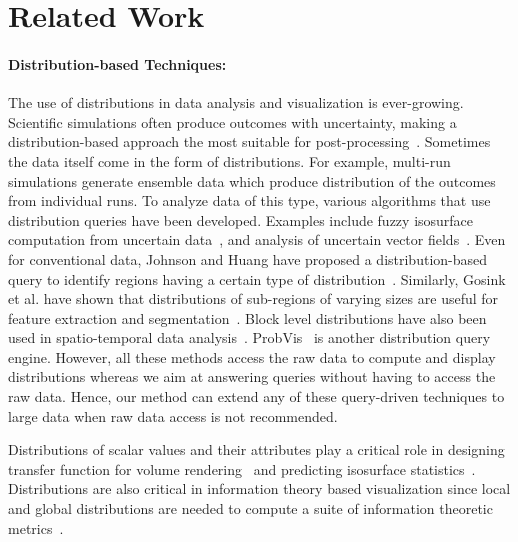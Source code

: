 \section{Related Work}
\label{sec:relwork}
\paragraph{Distribution-based Techniques:} The use of distributions in data analysis and visualization is ever-growing.  Scientific simulations often produce outcomes with uncertainty, making a distribution-based approach the most suitable for post-processing~\cite{Hixel11}. Sometimes the data itself come in the form of distributions. For example, multi-run simulations generate ensemble data which produce distribution of the outcomes from individual runs. To analyze data of this type, various algorithms that use distribution queries have been developed.  Examples include fuzzy isosurface computation from uncertain data~\cite{Hixel11}, and analysis of uncertain vector fields~\cite{uncertain3d11}. Even for conventional data, Johnson and Huang have proposed a distribution-based query to identify regions having a certain type of distribution~\cite{johnson09}. Similarly, Gosink et al. have shown that distributions of sub-regions of varying sizes are useful for feature extraction and segmentation~\cite{qdv11}. Block level distributions have also been used in spatio-temporal data analysis~\cite{transgraph11}. ProbVis~\cite{probvis12} is another distribution query engine. However, all these methods access the raw data to compute and display distributions whereas we aim at answering queries without having to access the raw data. Hence, our method can extend any of these query-driven techniques to large data when raw data access is not recommended.

Distributions of scalar values and their attributes play a critical role in designing transfer function for volume rendering~\cite{semiautomatic98, localhistogram06} and predicting isosurface statistics~\cite{carrhist06}. Distributions are also critical in information theory based visualization since local and global distributions are needed to compute a suite of information theoretic metrics~\cite{Xu10}.

